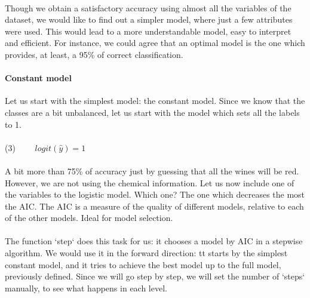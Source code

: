 \documentclass[10pt]{article}
\begin{document}
\paragraph*{}
Though we obtain a satisfactory accuracy using almost all the variables of the dataset, we would like to find out a simpler model, where just a few attributes were used. This would lead to a more understandable model, easy to interpret and efficient. For instance, we could agree that an optimal model is the one which provides, at least, a 95\% of correct classification.


\paragraph{Constant model}	

Let us start with the simplest model: the constant model. Since we know that the classes are a bit unbalanced, let us start with the model which sets all the labels to 1.

\paragraph*{}
(3) \ \ \ \  $logit(\hat{y}) = 1$

\paragraph*{}
A bit more than 75\% of accuracy just by guessing that all the wines will be red. However, we are not using the chemical information. Let us now include one of the variables to the logistic model. Which one? The one which decreases the most the AIC. The AIC is a measure of the quality of different models, relative to each of the other models. Ideal for model selection.

\paragraph*{}
The function `step` does this task for us: it chooses a model by AIC in a stepwise algorithm. We would use it in the forward direction: tt starts by the simplest constant model, and it tries to achieve the best model up to the full model, previously defined. Since we will go step by step, we will set the number of `steps` manually, to see what happens in each level.
\end{document}
